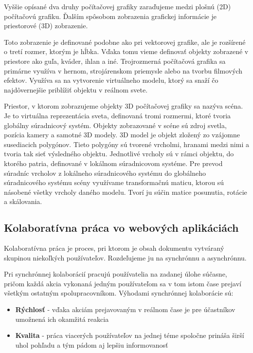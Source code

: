 Vyššie opísané dva druhy počítačovej grafiky zaraďujeme medzi plošnú (2D) počítačovú grafiku. Ďalším spôsobom zobrazenia grafickej informácie je priestorové (3D) zobrazenie. 

Toto zobrazenie je definované podobne ako pri vektorovej grafike, ale je rozšírené o tretí rozmer, ktorým je hĺbka. Vďaka tomu vieme definovať objekty zobrazené v priestore ako guľa, kváder, ihlan a iné. Trojrozmerná počítačová grafika sa primárne využíva v hernom, strojárenskom priemysle alebo na tvorbu filmových efektov. Využíva sa na vytvorenie virtuálneho modelu, ktorý sa snaží čo najdôvernejšie priblížiť objektu v reálnom svete. 

Priestor, v ktorom zobrazujeme objekty 3D počítačovej grafiky sa nazýva scéna. Je to virtuálna reprezentácia sveta, definovaná tromi rozmermi, ktoré tvoria globálny súradnicový systém. Objekty zobrazované v scéne sú zdroj svetla, pozícia kamery a samotné 3D modely. 3D model je objekt zložený zo vzájomne susediacich polygónov. Tieto polygóny sú tvorené vrcholmi, hranami medzi nimi a tvoria tak sieť výsledného objektu. Jednotlivé vrcholy sú v rámci objektu, do ktorého patria, definované v lokálnom súradnicovom systéme. Pre prevod súradníc vrcholov z lokálneho súradnicového systému do globálneho súradnicového systému scény využívame transformačnú maticu, ktorou sú násobené všetky vrcholy daného modelu. Tvorí ju súčin matice posunutia, rotácie a skálovania. 

\subsection{Kolaboratívna práca vo webových aplikáciách}

Kolaboratívna práca \cite{doi:10.1177/0021943603259363} je proces, pri ktorom je obsah dokumentu vytváraný skupinou niekoľkých používateľov. Rozdeľujeme ju na synchrónnu a asynchrónnu.

Pri synchrónnej kolaborácií pracujú používatelia na zadanej úlohe súčasne, pričom každá akcia vykonaná jedným používateľom sa v tom istom čase prejaví všetkým ostatným spolupracovníkom. Výhodami synchrónnej kolaborácie sú:
\begin{itemize}
	\item \textbf{Rýchlosť} - vďaka akciám prejavovaným v reálnom čase je pre účastníkov umožnená ich okamžitá reakcia
	\item \textbf{Kvalita} - práca viacerých používateľov na jednej téme spoločne prináša širší uhol pohľadu a tým pádom aj lepšiu informovanosť
\end{itemize}

